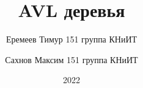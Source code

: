 \documentclass[aspectratio=169]{beamer}
\title{AVL деревья}
\institute[СГУ им. Чернышевского]{Саратовский Государственный Университет им. Чернышевского}
\author{Еремеев Тимур 151 группа КНиИТ}
\author{Сахнов Максим 151 группа КНиИТ}
\date{2022}
\begin{document}
    \frame{\titlepage}
    

    

    

    

    

    

    

    

    

    

    

    

    
   
    
\end{document}

